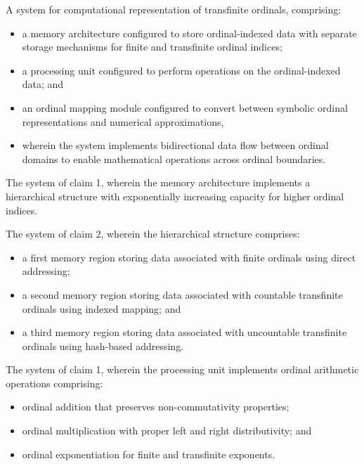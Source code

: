 \documentclass[12pt,letterpaper]{article}
\begin{document}
\begin{patentclaims}
    \item A system for computational representation of transfinite ordinals, comprising:
    \begin{itemize}[leftmargin=2em]
        \item a memory architecture configured to store ordinal-indexed data with separate storage mechanisms for finite and transfinite ordinal indices;
        \item a processing unit configured to perform operations on the ordinal-indexed data; and
        \item an ordinal mapping module configured to convert between symbolic ordinal representations and numerical approximations,
        \item wherein the system implements bidirectional data flow between ordinal domains to enable mathematical operations across ordinal boundaries.
    \end{itemize}
    
    \item The system of claim 1, wherein the memory architecture implements a hierarchical structure with exponentially increasing capacity for higher ordinal indices.
    
    \item The system of claim 2, wherein the hierarchical structure comprises:
    \begin{itemize}[leftmargin=2em]
        \item a first memory region storing data associated with finite ordinals using direct addressing;
        \item a second memory region storing data associated with countable transfinite ordinals using indexed mapping; and
        \item a third memory region storing data associated with uncountable transfinite ordinals using hash-based addressing.
    \end{itemize}
    
    \item The system of claim 1, wherein the processing unit implements ordinal arithmetic operations comprising:
    \begin{itemize}[leftmargin=2em]
        \item ordinal addition that preserves non-commutativity properties;
        \item ordinal multiplication with proper left and right distributivity; and
        \item ordinal exponentiation for finite and transfinite exponents.
    \end{itemize}
    

\end{patentclaims}
\end{document}
